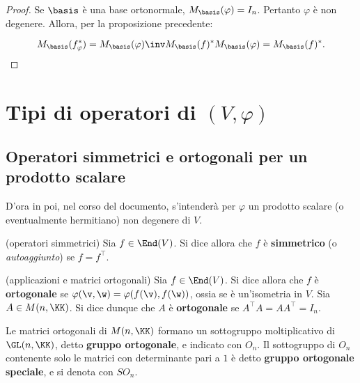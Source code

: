 \begin{proof}
	Se $\basis$ è una base ortonormale, $M_\basis(\varphi) = I_n$. Pertanto $\varphi$ è
	non degenere. Allora, per la proposizione precedente:
	
	\[ M_\basis(f_\varphi^*) = M_\basis(\varphi)\inv M_\basis(f)^* M_\basis(\varphi) = M_\basis(f)^*. \]
\end{proof}

\section{Tipi di operatori di $(V, \varphi)$}

\subsection{Operatori simmetrici e ortogonali per un prodotto scalare}

\begin{note}
	D'ora in poi, nel corso del documento, s'intenderà per $\varphi$ un prodotto scalare (o eventualmente hermitiano) non degenere di $V$.
\end{note}

\begin{definition} (operatori simmetrici)
	Sia $f \in \End(V)$. Si dice allora che $f$ è \textbf{simmetrico} (o \textit{autoaggiunto}) se $f = f^\top$.
\end{definition}

\begin{definition} (applicazioni e matrici ortogonali)
	Sia $f \in \End(V)$. Si dice allora che $f$ è \textbf{ortogonale} se $\varphi(\v, \w) = \varphi(f(\v), f(\w))$,
	ossia se è un'isometria in $V$.
	Sia $A \in M(n, \KK)$. Si dice dunque che $A$ è \textbf{ortogonale} se $A^\top A = A A^\top = I_n$.
\end{definition}

\begin{definition}
	Le matrici ortogonali di $M(n, \KK)$ formano un sottogruppo moltiplicativo di $\GL(n, \KK)$, detto \textbf{gruppo ortogonale},
	e indicato con $O_n$. Il sottogruppo di $O_n$ contenente solo le matrici con determinante pari a $1$ è
	detto \textbf{gruppo ortogonale speciale}, e si denota con $SO_n$.
\end{definition}

